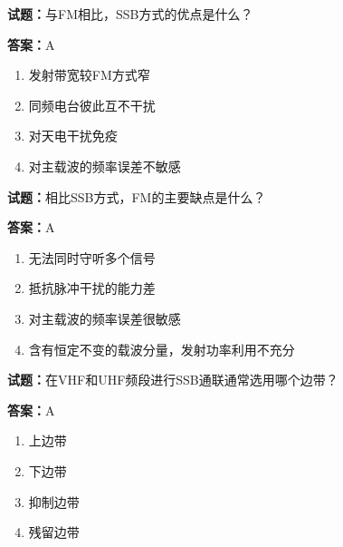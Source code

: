 \documentclass{ctexbook}
\begin{document}




\vspace{1em}

\textbf{试题：}与FM相比，SSB方式的优点是什么？ 

\textbf{答案：}A 

\begin{enumerate}[leftmargin=3em]
  \item 发射带宽较FM方式窄 

  \item 同频电台彼此互不干扰 

  \item 对天电干扰免疫 

  \item 对主载波的频率误差不敏感 

\end{enumerate}





\vspace{1em}

\textbf{试题：}相比SSB方式，FM的主要缺点是什么？ 

\textbf{答案：}A 

\begin{enumerate}[leftmargin=3em]
  \item 无法同时守听多个信号 

  \item 抵抗脉冲干扰的能力差 

  \item 对主载波的频率误差很敏感 

  \item 含有恒定不变的载波分量，发射功率利用不充分 

\end{enumerate}





\vspace{1em}

\textbf{试题：}在VHF和UHF频段进行SSB通联通常选用哪个边带？ 

\textbf{答案：}A 

\begin{enumerate}[leftmargin=3em]
  \item 上边带 

  \item 下边带 

  \item 抑制边带 

  \item 残留边带 


\end{enumerate}
\end{document}
